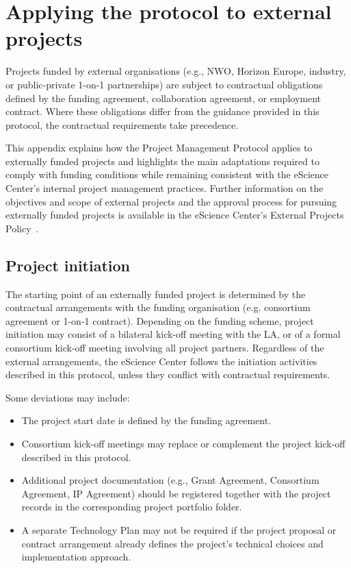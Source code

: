 \section{Applying the protocol to external projects}
\label{app:external-projects}

Projects funded by external organisations (e.g., NWO, Horizon Europe, industry, or public-private 1-on-1 
partnerships) are subject to contractual obligations defined by the funding agreement, collaboration agreement, or 
employment contract. Where these obligations differ from the guidance provided in this protocol, the contractual 
requirements take precedence.

This appendix explains how the Project Management Protocol applies to externally funded projects and highlights the 
main adaptations required to comply with funding conditions while remaining consistent with the eScience Center's 
internal project management practices. Further information on the objectives and scope of external projects and the 
approval process for pursuing externally funded projects is available in the eScience Center's External Projects 
Policy~\cite{nlesc-external-projects-policy}.

\subsection{Project initiation}
The starting point of an externally funded project is determined by the contractual arrangements with the funding 
organisation (e.g. consortium agreement or 1-on-1 contract). Depending on the funding scheme, project initiation 
may consist of a bilateral kick-off meeting with the LA, or of a formal consortium kick-off meeting involving all 
project partners. Regardless of the external arrangements, the eScience Center follows the initiation activities 
described in this protocol, unless they conflict with contractual requirements.

Some deviations may include: 
\vspace{-0.2cm}
\begin{itemize}
 \item The project start date is defined by the funding agreement.
 \item Consortium kick-off meetings may replace or complement the project kick-off described in this protocol.
 \item Additional project documentation (e.g., Grant Agreement, Consortium Agreement, IP Agreement) should be 
 registered together with the project records in the corresponding project portfolio folder.
 \item A separate Technology Plan may not be required if the project proposal or contract arrangement already defines 
 the project's technical choices and implementation approach. 
\end{itemize}
\vspace{-0.2cm}

